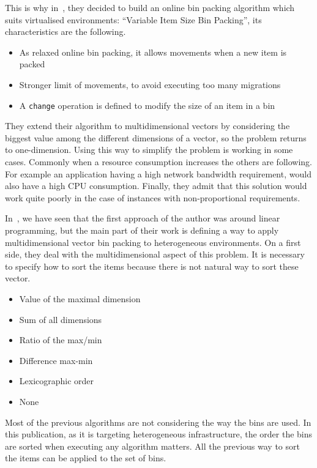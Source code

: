 This is why in~\cite{reassignmentVisbp}, they decided to build an online bin
packing algorithm which suits virtualised environments: “Variable Item Size Bin
Packing”, its characteristics are the following.

\begin{itemize}
	\item{As relaxed online bin packing, it allows movements when a new item is packed}
	\item{Stronger limit of movements, to avoid executing too many migrations}
	\item{A \texttt{change} operation is defined to modify the size of an item in a bin}
\end{itemize}

They extend their algorithm to multidimensional vectors by considering the biggest
value among the different dimensions of a vector, so the problem returns to
one-dimension. Using this way to simplify the problem is working in some cases.
Commonly when a resource consumption increases the others are following. For
example an application having a high network bandwidth requirement, would also have a
high CPU consumption. Finally, they admit that this solution would work quite poorly
in the case of instances with non-proportional requirements.

In~\cite{allocationHeterogeneous}, we have seen that the first approach of the author
was around linear programming, but the main part of their work is defining a way
to apply multidimensional vector bin packing to heterogeneous environments. On a first side,
they deal with the multidimensional aspect of this problem. It is necessary to specify how to
sort the items because there is not natural way to sort these vector.

\begin{itemize}
	\item Value of the maximal dimension
	\item Sum of all dimensions
	\item Ratio of the max/min
	\item Difference max-min
	\item Lexicographic order
	\item None
\end{itemize}

Most of the previous algorithms are not considering the way the bins are used.
In this publication, as it is targeting heterogeneous infrastructure, the order
the bins are sorted when executing any algorithm matters. All the previous way to
sort the items can be applied to the set of bins.

